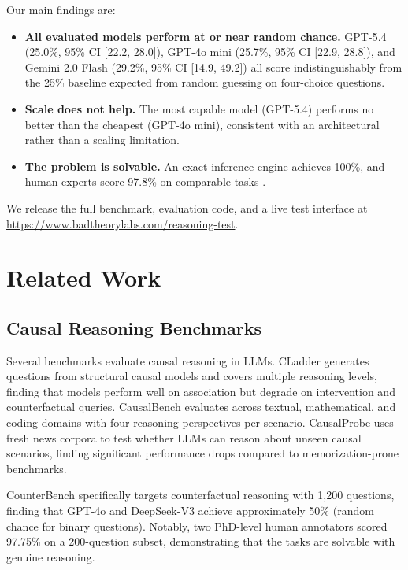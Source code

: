 \documentclass[11pt,a4paper]{article}
\begin{document}
Our main findings are:

\begin{itemize}
  \item \textbf{All evaluated models perform at or near random chance.} GPT-5.4 (25.0\%, 95\% CI [22.2, 28.0]), GPT-4o mini (25.7\%, 95\% CI [22.9, 28.8]), and Gemini 2.0 Flash (29.2\%, 95\% CI [14.9, 49.2]) all score indistinguishably from the 25\% baseline expected from random guessing on four-choice questions.
  \item \textbf{Scale does not help.} The most capable model (GPT-5.4) performs no better than the cheapest (GPT-4o mini), consistent with an architectural rather than a scaling limitation.
  \item \textbf{The problem is solvable.} An exact inference engine achieves 100\%, and human experts score 97.8\% on comparable tasks \cite{counterbench}.
\end{itemize}

We release the full benchmark, evaluation code, and a live test interface at \url{https://www.badtheorylabs.com/reasoning-test}.

\section{Related Work}

\subsection{Causal Reasoning Benchmarks}

Several benchmarks evaluate causal reasoning in LLMs. CLadder \cite{jin2024cladder} generates questions from structural causal models and covers multiple reasoning levels, finding that models perform well on association but degrade on intervention and counterfactual queries. CausalBench \cite{causalbench} evaluates across textual, mathematical, and coding domains with four reasoning perspectives per scenario. CausalProbe \cite{chi2024causalprobe} uses fresh news corpora to test whether LLMs can reason about unseen causal scenarios, finding significant performance drops compared to memorization-prone benchmarks.

CounterBench \cite{counterbench} specifically targets counterfactual reasoning with 1,200 questions, finding that GPT-4o and DeepSeek-V3 achieve approximately 50\% (random chance for binary questions). Notably, two PhD-level human annotators scored 97.75\% on a 200-question subset, demonstrating that the tasks are solvable with genuine reasoning.
\end{document}
